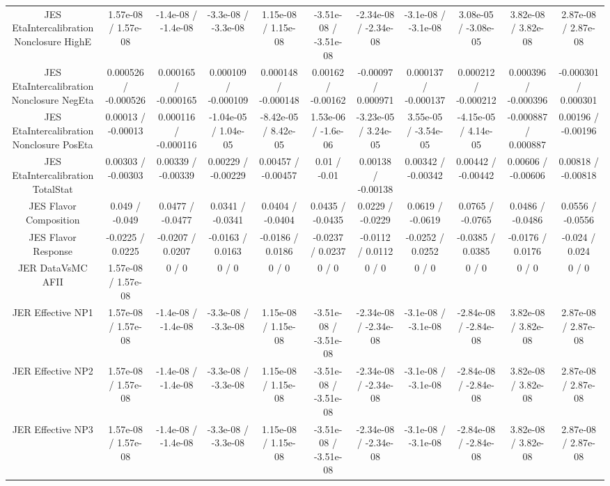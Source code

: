 \begin{table}[htbp]
\begin{center}
\begin{tabular}{|c|c|c|c|c|c|c|c|c|c|c|}
  JES EtaIntercalibration Nonclosure HighE & 1.57e-08 / 1.57e-08 & -1.4e-08 / -1.4e-08 & -3.3e-08 / -3.3e-08 & 1.15e-08 / 1.15e-08 & -3.51e-08 / -3.51e-08 & -2.34e-08 / -2.34e-08 & -3.1e-08 / -3.1e-08 & 3.08e-05 / -3.08e-05 & 3.82e-08 / 3.82e-08 & 2.87e-08 / 2.87e-08 \\ 
  JES EtaIntercalibration Nonclosure NegEta & 0.000526 / -0.000526 & 0.000165 / -0.000165 & 0.000109 / -0.000109 & 0.000148 / -0.000148 & 0.00162 / -0.00162 & -0.00097 / 0.000971 & 0.000137 / -0.000137 & 0.000212 / -0.000212 & 0.000396 / -0.000396 & -0.000301 / 0.000301 \\ 
  JES EtaIntercalibration Nonclosure PosEta & 0.00013 / -0.00013 & 0.000116 / -0.000116 & -1.04e-05 / 1.04e-05 & -8.42e-05 / 8.42e-05 & 1.53e-06 / -1.6e-06 & -3.23e-05 / 3.24e-05 & 3.55e-05 / -3.54e-05 & -4.15e-05 / 4.14e-05 & -0.000887 / 0.000887 & 0.00196 / -0.00196 \\ 
  JES EtaIntercalibration TotalStat & 0.00303 / -0.00303 & 0.00339 / -0.00339 & 0.00229 / -0.00229 & 0.00457 / -0.00457 & 0.01 / -0.01 & 0.00138 / -0.00138 & 0.00342 / -0.00342 & 0.00442 / -0.00442 & 0.00606 / -0.00606 & 0.00818 / -0.00818 \\ 
  JES Flavor Composition & 0.049 / -0.049 & 0.0477 / -0.0477 & 0.0341 / -0.0341 & 0.0404 / -0.0404 & 0.0435 / -0.0435 & 0.0229 / -0.0229 & 0.0619 / -0.0619 & 0.0765 / -0.0765 & 0.0486 / -0.0486 & 0.0556 / -0.0556 \\ 
  JES Flavor Response & -0.0225 / 0.0225 & -0.0207 / 0.0207 & -0.0163 / 0.0163 & -0.0186 / 0.0186 & -0.0237 / 0.0237 & -0.0112 / 0.0112 & -0.0252 / 0.0252 & -0.0385 / 0.0385 & -0.0176 / 0.0176 & -0.024 / 0.024 \\ 
  JER DataVsMC AFII & 1.57e-08 / 1.57e-08 & 0 / 0 & 0 / 0 & 0 / 0 & 0 / 0 & 0 / 0 & 0 / 0 & 0 / 0 & 0 / 0 & 0 / 0 \\ 
  JER Effective NP1 & 1.57e-08 / 1.57e-08 & -1.4e-08 / -1.4e-08 & -3.3e-08 / -3.3e-08 & 1.15e-08 / 1.15e-08 & -3.51e-08 / -3.51e-08 & -2.34e-08 / -2.34e-08 & -3.1e-08 / -3.1e-08 & -2.84e-08 / -2.84e-08 & 3.82e-08 / 3.82e-08 & 2.87e-08 / 2.87e-08 \\ 
  JER Effective NP2 & 1.57e-08 / 1.57e-08 & -1.4e-08 / -1.4e-08 & -3.3e-08 / -3.3e-08 & 1.15e-08 / 1.15e-08 & -3.51e-08 / -3.51e-08 & -2.34e-08 / -2.34e-08 & -3.1e-08 / -3.1e-08 & -2.84e-08 / -2.84e-08 & 3.82e-08 / 3.82e-08 & 2.87e-08 / 2.87e-08 \\ 
  JER Effective NP3 & 1.57e-08 / 1.57e-08 & -1.4e-08 / -1.4e-08 & -3.3e-08 / -3.3e-08 & 1.15e-08 / 1.15e-08 & -3.51e-08 / -3.51e-08 & -2.34e-08 / -2.34e-08 & -3.1e-08 / -3.1e-08 & -2.84e-08 / -2.84e-08 & 3.82e-08 / 3.82e-08 & 2.87e-08 / 2.87e-08 \\ 

\end{tabular}
\end{center}
\end{table}

